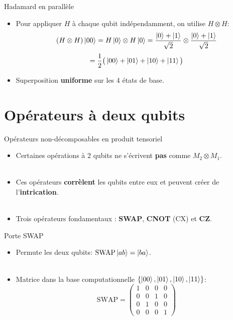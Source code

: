 \documentclass[aspectratio=169,12pt]{beamer}
\begin{document}
\begin{frame}{Hadamard en parallèle}
  \begin{itemize}[<+->]
    \setlength{\itemsep}{0.55em}
    \item Pour appliquer $H$ à chaque qubit indépendamment, on utilise $H\otimes H$:
    $$(H\otimes H)\ket{00} = H\ket{0}\otimes H\ket{0}
     = \frac{\ket{0}+\ket{1}}{\sqrt{2}}\otimes\frac{\ket{0}+\ket{1}}{\sqrt{2}}$$
    $$= \frac{1}{2}\big(\ket{00}+\ket{01}+\ket{10}+\ket{11}\big)$$
    \item Superposition \textbf{uniforme} sur les 4 états de base.
  \end{itemize}
\end{frame}

\section{Opérateurs à deux qubits}

\begin{frame}{Opérateurs non-décomposables en produit tensoriel}
  \begin{itemize}[<+->]
    \setlength{\itemsep}{0.6em}
    \item Certaines opérations à 2 qubits ne s'écrivent \textbf{pas} comme $M_2 \otimes M_1$.
    \\~\\
    \item Ces opérateurs \textbf{corrèlent} les qubits entre eux et peuvent créer de l'\textbf{intrication}.
    \\~\\
    \item Trois opérateurs fondamentaux : \textbf{SWAP}, \textbf{CNOT} (CX) et \textbf{CZ}.
  \end{itemize}
\end{frame}

\begin{frame}{Porte SWAP}
  \begin{itemize}[<+->]
    \setlength{\itemsep}{0.55em}
    \item Permute les deux qubits: $\text{SWAP}\ket{ab} = \ket{ba}$.\\~\\
    \item Matrice dans la base computationnelle $\{\ket{00},\ket{01},\ket{10},\ket{11}\}$:
    $$\text{SWAP} = \begin{pmatrix} 1&0&0&0 \\ 0&0&1&0 \\ 0&1&0&0 \\ 0&0&0&1 \end{pmatrix}$$
  \end{itemize}
\end{frame}
\end{document}

